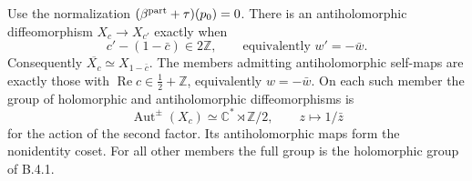 \begin{proposition}[B.4.2; Proved]\label{st:B.4.2}
Use the normalization $(\beta^{\rm part}+\tau)(p_0)=0$. There is an antiholomorphic diffeomorphism $X_c\to X_{c'}$ exactly when
\[
 c'-(1-\bar c)\in2\mathbb Z,
 \qquad\text{equivalently }w'=-\bar w.
\]
Consequently $\overline{X_c}\simeq X_{1-\bar c}$. The members admitting antiholomorphic self-maps are exactly those with $\operatorname{Re}c\in\tfrac12+\mathbb Z$, equivalently $w=-\bar w$. On each such member the group of holomorphic and antiholomorphic diffeomorphisms is
\[
 \operatorname{Aut}^{\pm}(X_c)\simeq\mathbb C^*\rtimes\mathbb Z/2,
 \qquad z\longmapsto1/\bar z
\]
for the action of the second factor. Its antiholomorphic maps form the nonidentity coset. For all other members the full group is the holomorphic group of B.4.1.
\end{proposition}
